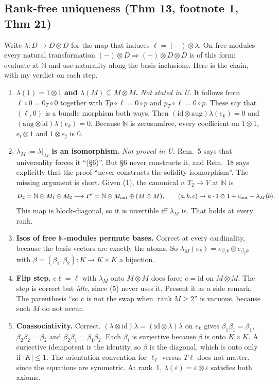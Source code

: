 \documentclass[11pt]{article}
\newcommand{\N}{\mathbb{N}}
\begin{document}
\subsection{Rank-free uniqueness (Thm 13, footnote 1, Thm 21)}
Write $\lambda\colon D\to D\otimes D$ for the map that induces $\ell=(-)\otimes\lambda$. On free
modules every natural transformation $(-)\otimes D\Rightarrow(-)\otimes D\otimes D$ is of this
form: evaluate at $\N$ and use naturality along the basis inclusions. Here is the chain, with my
verdict on each step.
\begin{enumerate}[label=(\arabic*),leftmargin=*]
\item \textbf{$\lambda(1)=1\otimes1$ and $\lambda(M)\subseteq M\otimes M$.} \emph{Not stated in U.} It
follows from $\ell\circ0=0_T\circ0$ together with $Tp\circ\ell=0\circ p$ and
$p_T\circ\ell=0\circ p$. These say that $(\ell,0)$ is a bundle morphism both ways. Then
$(\mathrm{id}\otimes\mathrm{aug})\lambda(e_k)=0$ and $(\mathrm{aug}\otimes\mathrm{id})\lambda(e_k)=0$.
Because $\N$ is zerosumfree, every coefficient on $1\otimes1$, $e_i\otimes1$ and $1\otimes e_j$ is $0$.
\item \textbf{$\lambda_M:=\lambda|_M$ is an isomorphism.} \emph{Not proved in U.} Rem.~5 says that
universality forces it ``(\S6)''. But \S6 never constructs it, and Rem.~18 says explicitly that the
proof ``never constructs the solidity isomorphism''. The missing argument is short. Given (1), the
canonical $v\colon T_2\to V$ at $\N$ is
\[
D_2=\N\oplus M_1\oplus M_2\longrightarrow P'=\N\oplus M_{\rm out}\oplus(M\otimes M),\qquad
(a,b,c)\mapsto a\cdot1\otimes1+c_{\rm out}+\lambda_M(b).
\]
This map is block-diagonal, so it is invertible iff $\lambda_M$ is. That holds at every rank.
\item \textbf{Isos of free $\N$-modules permute bases.} Correct at every cardinality, because the
basis vectors are exactly the atoms. So $\lambda_M(e_k)=e_{\beta_1k}\otimes e_{\beta_2k}$ with
$\beta=(\beta_1,\beta_2)\colon K\to K\times K$ a bijection.
\item \textbf{Flip step.} $c\ell=\ell$ with $\lambda_M$ onto $M\otimes M$ does force $c=\mathrm{id}$ on
$M\otimes M$. The step is correct but \emph{idle}, since (5) never uses it. Present it as a side
remark. The parenthesis ``so $c$ is not the swap when $\operatorname{rank}M\ge2$'' is vacuous,
because such $M$ do not occur.
\item \textbf{Coassociativity.} Correct. $(\lambda\otimes\mathrm{id})\lambda=(\mathrm{id}\otimes
\lambda)\lambda$ on $e_k$ gives $\beta_1\beta_1=\beta_1$, $\beta_2\beta_2=\beta_2$ and
$\beta_2\beta_1=\beta_1\beta_2$. Each $\beta_i$ is surjective because $\beta$ is onto $K\times K$. A
surjective idempotent is the identity, so $\beta$ is the diagonal, which is onto only if
$|K|\le1$. The orientation convention for $\ell_T$ versus $T\ell$ does not matter, since the
equations are symmetric. At rank~1, $\lambda(\varepsilon)=\varepsilon\otimes\varepsilon$ satisfies
both axioms.
\end{enumerate}
\end{document}
